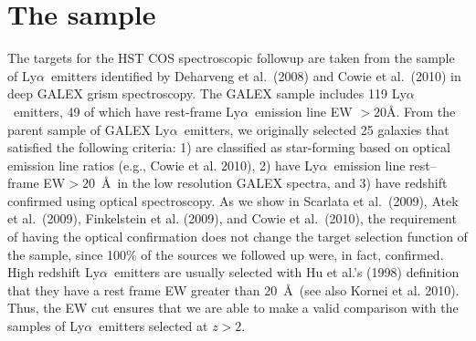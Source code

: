 \documentclass[manuscript]{emulateapj}
\newcommand{\lya}{Ly$\alpha$}
\newcommand{\ha}{H$\alpha$}
\newcommand{\hb}{H$\beta$}
\newcommand{\oiii}{[O~{\small III}]}
\newcommand{\civ}{C~{\small IV}}
\newcommand{\ciii}{[C~{\small III]}}
\newcommand{\nii}{[N~{\small II]}}
\newcommand{\kms}{km s$^{-1}$}
\begin{document}
\section{The sample}
The targets for the HST COS spectroscopic followup are taken from the
sample of \lya\ emitters identified by Deharveng et al.\ (2008) and
Cowie et al.\ (2010) in deep GALEX grism spectroscopy. The GALEX
sample includes 119 \lya\ emitters, 49 of which have rest-frame \lya\
emission line EW $>20$\AA.  From the parent sample of GALEX \lya\
emitters, we originally selected 25 galaxies that satisfied the
following criteria: 1) are classified as star-forming based on optical
emission line ratios (e.g., Cowie et al. 2010), 2) have \lya\ emission
line rest--frame EW$>20$~\AA\ in the low resolution GALEX spectra, and
3) have redshift confirmed using optical spectroscopy.  As we show in
Scarlata et al.\ (2009), Atek et al.\ (2009), Finkelstein et
al. (2009), and Cowie et al.\ (2010), the requirement of having the
optical confirmation does not change the target selection function of
the sample, since 100\% of the sources we followed up were, in fact,
confirmed.  %
High redshift \lya\ emitters are usually selected with Hu et al.'s
(1998) definition that they have a rest frame EW greater than
$20$~\AA\ (see also Kornei et al. 2010). Thus, the EW cut ensures that
we are able to make a valid comparison with the samples of \lya\
emitters selected at $z>2$. 

\end{document}
